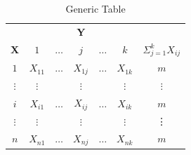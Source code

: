 \begin{table}[ht]
	\begin{center}
		\caption{Generic Table}\label{tab:gen}
		\begin{tabular}{lcccccc}
			
			& & & & & & \\ \hline
			\multicolumn{1}{|c}{}  & \multicolumn{5}{|c|}{\bf Y} &
			\multicolumn{1}{c|}{} \\
			
			\multicolumn{1}{|c}{\bf X} & \multicolumn{1}{|c}{$1$} & $\ldots$ & $j$ & $\ldots$ &
			\multicolumn{1}{c|}{$k$} & \multicolumn{1}{c|}{$\Sigma_{j=1}^k{X_{ij}}$} \\ \hline
			
			\multicolumn{1}{|c}{$1$} & \multicolumn{1}{|c}{$X_{11}$} & $\ldots$ & $X_{1j}$ &
			$\ldots$ & \multicolumn{1}{c|}{$X_{1k}$} &
			\multicolumn{1}{c|}{$m$}\\
			
			\multicolumn{1}{|c}{$\vdots$} & \multicolumn{1}{|c}{$\vdots$} &  & $\vdots$ &  &
			\multicolumn{1}{c|}{$\vdots$} &
			\multicolumn{1}{c|}{$\vdots$}\\
			
			\multicolumn{1}{|c}{$i$} & \multicolumn{1}{|c}{$X_{i1}$} & $\dots$ & $X_{ij}$ &
			$\ldots$ & \multicolumn{1}{c|}{$X_{ik}$} &
			\multicolumn{1}{c|}{$m$} \\
			
			\multicolumn{1}{|c}{$\vdots$} & \multicolumn{1}{|c}{$\vdots$} &
			& $\vdots$ &  & \multicolumn{1}{c|}{$\vdots$} & \multicolumn{1}{c|}{\vdots} \\
			
			\multicolumn{1}{|c}{$n$} & \multicolumn{1}{|c}{$X_{n1}$} & $\dots$ & $X_{nj}$ &
			$\ldots$ & \multicolumn{1}{c|}{$X_{nk}$} & \multicolumn{1}{c|}{$m$}\\ \hline
			
		\end{tabular}
	\end{center}
\end{table}